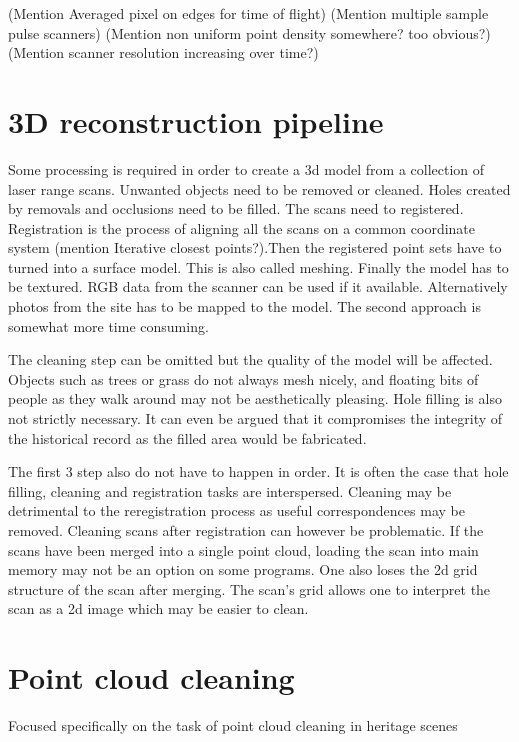 (Mention Averaged pixel on edges for time of flight)
(Mention multiple sample pulse scanners)
(Mention non uniform point density somewhere? too obvious?)
(Mention scanner resolution increasing over time?)

\section{3D reconstruction pipeline} \label{sec:pipeline}

Some processing is required in order to create a 3d model from a collection of laser range scans. Unwanted objects need to be removed or cleaned. Holes created by removals and occlusions need to be filled. The scans need to registered. Registration is the process of aligning all the scans on a common coordinate system (mention Iterative closest points?).Then the registered point sets have to turned into a surface model. This is also called meshing. Finally the model has to be textured. RGB data from the scanner can be used if it available. Alternatively photos from the site has to be mapped to the model. The second approach is somewhat more time consuming.

The cleaning step can be omitted but the quality of the model will be affected. Objects such as trees or grass do not always mesh nicely, and floating bits of people as they walk around may not be aesthetically pleasing. Hole filling is also not strictly necessary. It can even be argued that it compromises the integrity of the historical record as the filled area would be fabricated.

The first 3 step also do not have to happen in order. It is often the case that hole filling, cleaning and registration tasks are interspersed. Cleaning may be detrimental to the reregistration process as useful correspondences may be removed. Cleaning scans after registration can however be problematic. If the scans have been merged into a single point cloud, loading the scan into main memory may not be an option on some programs. One also loses the 2d grid structure of the scan after merging. The scan's grid allows one to interpret the scan as a 2d image which may be easier to clean.


\section{Point cloud cleaning} \label{sec:cleaning}
	Focused specifically on the task of point cloud cleaning in heritage scenes

